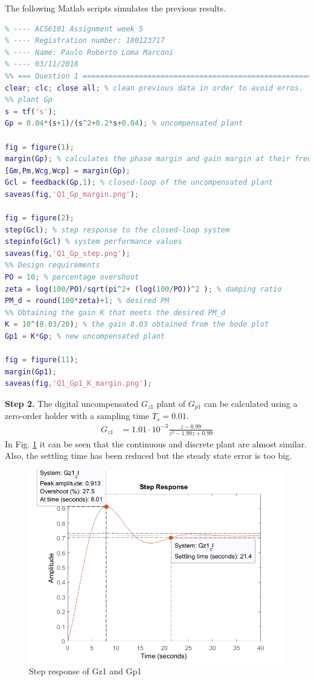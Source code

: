 \documentclass[11pt, a4paper]{article}
\begin{document}
The following Matlab scripts simulates the previous results.
\begin{lstlisting}[language=matlab, caption={}, label={}]
%% ========================================================================
% ---- ACS6101 Assignment week 5
% ---- Registration number: 180123717
% ---- Name: Paulo Roberto Loma Marconi
% ---- 03/11/2018
%% === Question 1 =========================================================
clear; clc; close all; % clean previous data in order to avoid erros.
%% plant Gp 
s = tf('s');
Gp = 0.04*(s+1)/(s^2+0.2*s+0.04); % uncompensated plant

fig = figure(1); 
margin(Gp); % calculates the phase margin and gain margin at their frequencies
[Gm,Pm,Wcg,Wcp] = margin(Gp);
Gcl = feedback(Gp,1); % closed-loop of the uncompensated plant
saveas(fig,'Q1_Gp_margin.png');

fig = figure(2);
step(Gcl); % step response to the closed-loop system
stepinfo(Gcl) % system performance values
saveas(fig,'Q1_Gp_step.png');
%% Design requirements
PO = 10; % percentage overshoot
zeta = log(100/PO)/sqrt(pi^2+ (log(100/PO))^2 ); % damping ratio
PM_d = round(100*zeta)+1; % desired PM
%% Obtaining the gain K that meets the desired PM_d
K = 10^(8.03/20); % the gain 8.03 obtained from the bode plot
Gp1 = K*Gp; % new uncompensated plant

fig = figure(11);
margin(Gp1);
saveas(fig,'Q1_Gp1_K_margin.png');
\end{lstlisting}

\textbf{Step 2.} The digital uncompensated $G_{z1}$ plant of $G_{p1}$ can be calculated using a zero-order holder with a sampling time $T_s=0.01$.
\begin{align}
G_{z1} &= 1.01\cdot10^{-3}\frac{z-0.99}{z^2-1.99z+0.99}
\end{align} 
In Fig. \ref{fig:Q1_Gz1_K_step} it can be seen that the continuous and discrete plant are almost similar. Also, the settling time has been reduced but the steady state error is too big.

\begin{figure}[H]
	\centering
	\includegraphics[width=0.48\linewidth]{../Q1_Gpz_K_step_a.png}
	\caption{Step response of Gz1 and Gp1}
	\label{fig:Q1_Gz1_K_step}
\end{figure}
\end{document}
